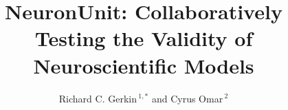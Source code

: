 \documentclass{frontiersSCNS}
\def\firstAuthorLast{Sample {et~al.}} %
\def\Authors{Richard C. Gerkin\,$^{1,*}$ and Cyrus Omar\,$^{2}$}
\begin{document}
\onecolumn
{}

\title[Running Title]{NeuronUnit: Collaboratively Testing the Validity of Neuroscientific Models}
\author[\firstAuthorLast ]{\Authors}
\address{}
\correspondance{}
\extraAuth{}%

\maketitle
\end{document}
